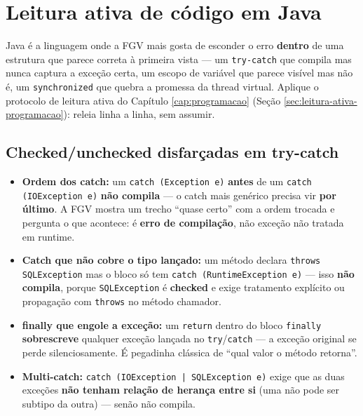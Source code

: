 \section{Leitura ativa de código em Java}
\label{sec:leitura-ativa-java}

Java é a linguagem onde a FGV mais gosta de esconder o erro \textbf{dentro}
de uma estrutura que parece correta à primeira vista --- um \texttt{try-catch}
que compila mas nunca captura a exceção certa, um escopo de variável que
parece visível mas não é, um \texttt{synchronized} que quebra a promessa da
thread virtual. Aplique o protocolo de leitura ativa do Capítulo
\ref{cap:programacao} (Seção \ref{sec:leitura-ativa-programacao}): releia
linha a linha, sem assumir.

\subsection{Checked/unchecked disfarçadas em try-catch}

\begin{conceito}
\begin{itemize}
\item \textbf{Ordem dos catch:} um \texttt{catch (Exception e)} \textbf{antes}
de um \texttt{catch (IOException e)} \textbf{não compila} --- o catch mais
genérico precisa vir \textbf{por último}. A FGV mostra um trecho ``quase
certo'' com a ordem trocada e pergunta o que acontece: é \textbf{erro de
compilação}, não exceção não tratada em runtime.
\item \textbf{Catch que não cobre o tipo lançado:} um método declara
\texttt{throws SQLException} mas o bloco só tem
\texttt{catch (RuntimeException e)} --- isso \textbf{não compila}, porque
\texttt{SQLException} é \textbf{checked} e exige tratamento explícito ou
propagação com \texttt{throws} no método chamador.
\item \textbf{finally que engole a exceção:} um \texttt{return} dentro do
bloco \texttt{finally} \textbf{sobrescreve} qualquer exceção lançada no
\texttt{try}/\texttt{catch} --- a exceção original se perde silenciosamente.
É pegadinha clássica de ``qual valor o método retorna''.
\item \textbf{Multi-catch:} \texttt{catch (IOException | SQLException e)}
exige que as duas exceções \textbf{não tenham relação de herança entre si}
(uma não pode ser subtipo da outra) --- senão não compila.
\end{itemize}
\end{conceito}

